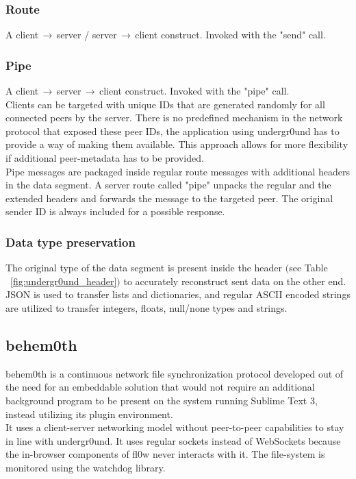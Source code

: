 \documentclass[conference]{IEEEtran}
\begin{document}
\subsubsection{Route}
A client$\,\to\,$server / server$\,\to\,$client construct. Invoked with the {\color{deepgreen}"send"} call.

\subsubsection{Pipe}
A client$\,\to\,$server$\,\to\,$client construct. Invoked with the {\color{deepgreen}"pipe"} call. \\Clients can be targeted with unique IDs that are generated randomly for all connected peers by the server. There is no predefined mechanism in the network protocol that exposed these peer IDs, the application using undergr0und\cite{undergr0und:Philip Trauner} has to provide a way of making them available. This approach allows for more flexibility if additional peer-metadata has to be provided. \\Pipe messages are packaged inside regular route messages with additional headers in the data segment. A server route called {\color{deepgreen}"pipe"} unpacks the regular and the extended headers and forwards the message to the targeted peer. The original sender ID is always included for a possible response.\\

\subsubsection{Data type preservation}
The original type of the data segment is present inside the header $($see Table ~\ref{fig:undergr0und_header}$)$ to accurately reconstruct sent data on the other end. JSON\cite{JSON:T. Bray Ed.} is used to transfer lists and dictionaries, and regular ASCII encoded strings are utilized to transfer integers, floats, null/none types and strings.

\subsection{behem0th}
behem0th\cite{behem0th:Christoph Heiss} is a continuous network file synchronization protocol developed out of the need for an embeddable solution that would not require an additional background program to be present on the system running Sublime Text 3\cite{Sublime Text 3:Sublime HQ}, instead utilizing its plugin environment. \\It uses a client-server networking model without peer-to-peer capabilities to stay in line with undergr0und. It uses regular sockets instead of WebSockets\cite{The WebSocket Protocol:A. Melnikov} because the in-browser components of fl0w\cite{fl0w:Philip Trauner} never interacts with it. The file-system is monitored using the watchdog\cite{watchdog:Yesudeep Mangalapilly} library.\\
\end{document}
